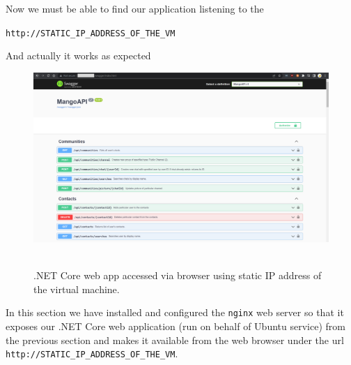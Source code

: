 Now we must be able to find our application listening to the
\begin{center}
    \texttt{http://STATIC\_IP\_ADDRESS\_OF\_THE\_VM}
\end{center}
And actually it works as expected
\begin{figure}[H]
    \centering
    \includegraphics[width=1\textwidth]{img/06_view_in_browser}
    ~\caption{.NET Core web app accessed via browser using static IP address of the virtual machine.}\label{fig:figure17}
\end{figure}
In this section we have installed and configured the \texttt{nginx} web server so that it exposes our .NET Core web
application (run on behalf of Ubuntu service) from the previous section and makes it available
from the web browser under the url \texttt{http://STATIC\_IP\_ADDRESS\_OF\_THE\_VM}.